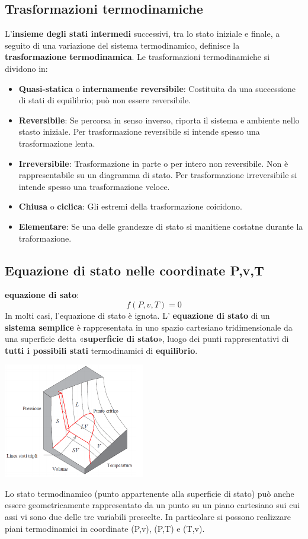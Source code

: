 \subsection{Trasformazioni termodinamiche}
L’\textbf{insieme degli stati intermedi} successivi, tra lo stato iniziale e finale, a seguito di una variazione del sistema termodinamico, definisce la \textbf{trasformazione termodinamica}.\newline
\newline
Le trasformazioni termodinamiche si dividono in:
\begin{itemize}
    \item \textbf{Quasi-statica} o \textbf{internamente reversibile}: Costituita da una successione di stati di equilibrio; può non essere reversibile. 
    \item \textbf{Reversibile}: Se percorsa in senso inverso, riporta il sistema e ambiente nello stasto iniziale. Per trasformazione reversibile si intende spesso una trasformazione lenta.
    \item \textbf{Irreversibile}: Trasformazione in parte o per intero non reversibile. Non è rappresentabile su un diagramma di stato. Per trasformazione irreversibile si intende spesso una trasformazione veloce.
    \item \textbf{Chiusa} o \textbf{ciclica}: Gli estremi della trasformazione coicidono.
    \item \textbf{Elementare}: Se una delle grandezze di stato si manitiene costatne durante la traformazione.
\end{itemize}
\subsection{Equazione di stato nelle coordinate P,v,T}
\textbf{equazione di sato}:
\[
    f(P,v,T) = 0
\]
In molti casi, l'equazione di stato è ignota.\newline
\newline
L’ \textbf{equazione di stato} di un \textbf{sistema semplice} è rappresentata in uno spazio cartesiano tridimensionale da una superficie detta «\textbf{superficie di stato}», luogo dei punti rappresentativi di \textbf{tutti i possibili stati} termodinamici di \textbf{equilibrio}.
\begin{center}
    \includegraphics[height=5cm]{../L01/img4.PNG}
\end{center}
Lo stato termodinamico (punto appartenente alla superficie di stato) può anche essere geometricamente
rappresentato da un punto su un piano cartesiano sui cui assi vi sono due delle tre variabili prescelte.\newline
In particolare si possono realizzare piani termodinamici in coordinate (P,v), (P,T) e (T,v).
